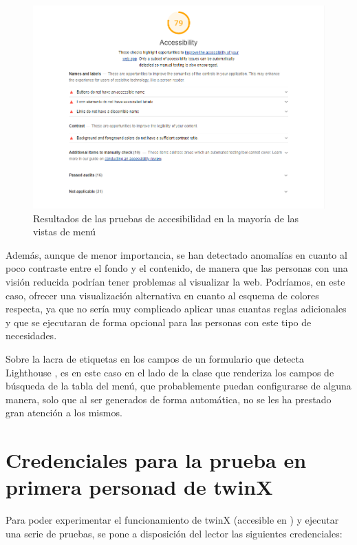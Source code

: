\begin{figure}
	\centering
	\includegraphics[width=\linewidth]{img/test_accesibilidad}
	\caption[Resultados de las pruebas de accesibilidad]{Resultados de las pruebas de accesibilidad en la mayoría de las vistas de menú}
	\label{fig:testaccesibilidad}
\end{figure}

Además, aunque de menor importancia, se han detectado anomalías en cuanto al poco contraste entre el fondo y el contenido, de manera que las personas con una visión reducida podrían tener problemas al visualizar la web. Podríamos, en este caso, ofrecer una visualización alternativa en cuanto al esquema de colores respecta, ya que no sería muy complicado aplicar unas cuantas reglas adicionales y que se ejecutaran de forma opcional para las personas con este tipo de necesidades.

Sobre la lacra de etiquetas en los campos de un formulario que detecta Lighthouse \cite{lighthouse}, es en este caso en el lado de la clase que renderiza los campos de búsqueda de la tabla del menú, que probablemente puedan configurarse de alguna manera, solo que al ser generados de forma automática, no se les ha prestado gran atención a los mismos.

\section{Credenciales para la prueba en primera personad de twinX}

Para poder experimentar el funcionamiento de twinX (accesible en \cite{twinx}) y ejecutar una serie de pruebas, se pone a disposición del lector las siguientes credenciales:

